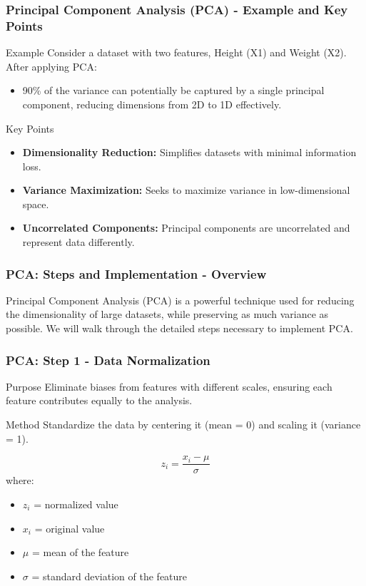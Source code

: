 \documentclass[aspectratio=169]{beamer}
\begin{document}
\begin{frame}[fragile]
  \frametitle{Principal Component Analysis (PCA) - Example and Key Points}
  \begin{block}{Example}
    Consider a dataset with two features, Height (X1) and Weight (X2). After applying PCA:
    \begin{itemize}
      \item 90\% of the variance can potentially be captured by a single principal component, reducing dimensions from 2D to 1D effectively.
    \end{itemize}
  \end{block}

  \begin{block}{Key Points}
    \begin{itemize}
      \item \textbf{Dimensionality Reduction:} Simplifies datasets with minimal information loss.
      \item \textbf{Variance Maximization:} Seeks to maximize variance in low-dimensional space.
      \item \textbf{Uncorrelated Components:} Principal components are uncorrelated and represent data differently.
    \end{itemize}
  \end{block}
\end{frame}

\begin{frame}[fragile]
    \frametitle{PCA: Steps and Implementation - Overview}
    Principal Component Analysis (PCA) is a powerful technique used for reducing the dimensionality of large datasets, while preserving as much variance as possible. We will walk through the detailed steps necessary to implement PCA.
\end{frame}

\begin{frame}[fragile]
    \frametitle{PCA: Step 1 - Data Normalization}
    \begin{block}{Purpose}
    Eliminate biases from features with different scales, ensuring each feature contributes equally to the analysis.
    \end{block}
    
    \begin{block}{Method}
    Standardize the data by centering it (mean = 0) and scaling it (variance = 1).
    \end{block}
    
    \begin{equation}
        z_i = \frac{x_i - \mu}{\sigma}
    \end{equation}
    where:
    \begin{itemize}
        \item \( z_i \) = normalized value
        \item \( x_i \) = original value
        \item \( \mu \) = mean of the feature
        \item \( \sigma \) = standard deviation of the feature
    \end{itemize}
\end{frame}
\end{document}
